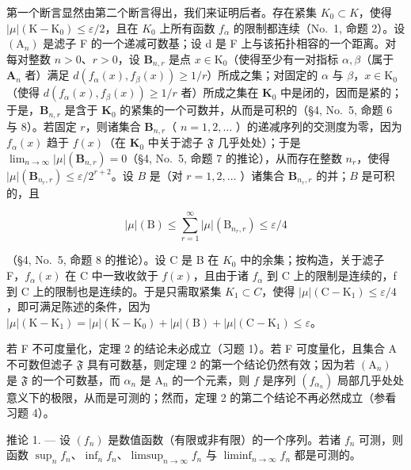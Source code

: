 第一个断言显然由第二个断言得出，我们来证明后者。存在紧集 \(K_{0} \subset K\)，使得 \(|\mu|(\mathrm{K} - \mathrm{K}_{0}) \leqslant \varepsilon/2\)，且在 \(K_{0}\) 上所有函数 \(f_{\alpha}\) 的限制都连续（No.~1, 命题 2）。设 \((\mathrm{A}_{n})\) 是滤子 F 的一个递减可数基；设 d 是 F 上与该拓扑相容的一个距离。对每对整数 \(n > 0\)、\(r > 0\)，设 \(\mathbf{B}_{n,r}\) 是点 \(x \in \mathrm{K}_0\)（使得至少有一对指标 \(\alpha, \beta\)（属于 \(\mathbf{A}_n\) 者）满足 \(d(f_{\alpha}(x), f_{\beta}(x)) \geqslant 1 / r\)）所成之集；对固定的 \(\alpha\) 与 \(\beta\)，\(x \in \mathrm{K}_0\)（使得 \(d(f_{\alpha}(x), f_{\beta}(x)) \geqslant 1 / r\) 者）所成之集在 \(\mathbf{K}_0\) 中是闭的，因而是紧的；于是，\(\mathbf{B}_{n,r}\) 是含于 \(\mathbf{K}_0\) 的紧集的一个可数并，从而是可积的（§4, No.~5, 命题 6 与 8）。若固定 \(r\)，则诸集合 \(\mathbf{B}_{n,r}\)（ \(n = 1,2,\ldots\) ）的递减序列的交测度为零，因为 \(f_{\alpha}(x)\) 趋于 \(f(x)\)（在 \(\mathbf{K}_0\) 中关于滤子 \(\mathfrak{F}\) 几乎处处）；于是 \(\lim_{n \to \infty} |\mu|(\mathbf{B}_{n,r}) = 0\)（§4, No.~5, 命题 7 的推论），从而存在整数 \(n_r\)，使得 \(|\mu|(\mathbf{B}_{n_r,r}) \leqslant \varepsilon / 2^{r+2}\)。设 \(B\) 是（对 \(r = 1,2,\ldots\) ）诸集合 \(\mathbf{B}_{n_r,r}\) 的并；\(B\) 是可积的，且

\[
| \mu | (\mathrm{B}) \leqslant \sum_ {r = 1} ^ {\infty} | \mu | (\mathrm{B} _ {n _ {r}, r}) \leqslant \varepsilon / 4
\]

（§4, No.~5, 命题 8 的推论）。设 C 是 B 在 \(K_{0}\) 中的余集；按构造，关于滤子 F，\(f_{\alpha}(x)\) 在 C 中一致收敛于 \(f(x)\)，且由于诸 \(f_{\alpha}\) 到 C 上的限制是连续的，f 到 C 上的限制也是连续的。于是只需取紧集 \(K_{1} \subset C\)，使得 \(|\mu|(\mathrm{C} - \mathrm{K}_{1}) \leqslant \varepsilon/4\)，即可满足陈述的条件，因为 \(|\mu|(\mathrm{K} - \mathrm{K}_{1}) = |\mu|(\mathrm{K} - \mathrm{K}_{0}) + |\mu|(\mathrm{B}) + |\mu|(\mathrm{C} - \mathrm{K}_{1}) \leqslant \varepsilon\)。

若 F 不可度量化，定理 2 的结论未必成立（习题 1）。若 F 可度量化，且集合 A 不可数但滤子 \(\mathfrak{F}\) 具有可数基，则定理 2 的第一个结论仍然有效；因为若 \((\mathrm{A}_n)\) 是 \(\mathfrak{F}\) 的一个可数基，而 \(\alpha_{n}\) 是 \(\mathrm{A}_n\) 的一个元素，则 \(f\) 是序列 \((f_{\alpha_n})\) 局部几乎处处意义下的极限，从而是可测的；然而，定理 2 的第二个结论不再必然成立（参看习题 4）。

推论 1. --- 设 \((f_n)\) 是数值函数（有限或非有限）的一个序列。若诸 \(f_n\) 可测，则函数 \(\sup_{n} f_n\)、\(\inf_{n} f_n\)、\(\limsup_{n \to \infty} f_n\) 与 \(\liminf_{n \to \infty} f_n\) 都是可测的。

